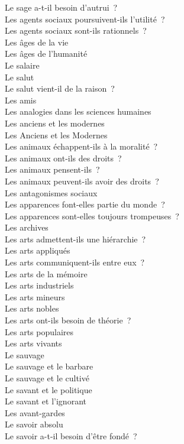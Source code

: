 \documentclass[a4paper,12pt]{article}
\begin{document}
Le sage a-t-il besoin d'autrui ? \\
Les agents sociaux poursuivent-ils l'utilité ? \\
Les agents sociaux sont-ils rationnels ? \\
Les âges de la vie \\
Les âges de l'humanité \\
Le salaire \\
Le salut \\
Le salut vient-il de la raison ? \\
Les amis \\
Les analogies dans les sciences humaines \\
Les anciens et les modernes \\
Les Anciens et les Modernes \\
Les animaux échappent-ils à la moralité ? \\
Les animaux ont-ils des droits ? \\
Les animaux pensent-ils ? \\
Les animaux peuvent-ils avoir des droits ? \\
Les antagonismes sociaux \\
Les apparences font-elles partie du monde ? \\
Les apparences sont-elles toujours trompeuses ? \\
Les archives \\
Les arts admettent-ils une hiérarchie ? \\
Les arts appliqués \\
Les arts communiquent-ils entre eux ? \\
Les arts de la mémoire \\
Les arts industriels \\
Les arts mineurs \\
Les arts nobles \\
Les arts ont-ils besoin de théorie ? \\
Les arts populaires \\
Les arts vivants \\
Le sauvage \\
Le sauvage et le barbare \\
Le sauvage et le cultivé \\
Le savant et le politique \\
Le savant et l'ignorant \\
Les avant-gardes \\
Le savoir absolu \\
Le savoir a-t-il besoin d'être fondé ? \\
\end{document}
